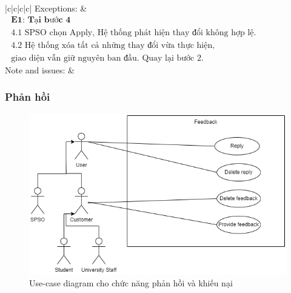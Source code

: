 \begin{tabular}{|c|c|c|c|}
\hline Exceptions: & 
{$
\begin{array}{l}
\textbf { E1: Tại bước 4 } \\
\text { 4.1 SPSO chọn Apply, Hệ thống phát hiện thay đổi không hợp lệ.} \\
\text { 4.2 Hệ thống xóa tất cả những thay đổi vừa thực hiện,} \\
\text { giao diện vẫn giữ nguyên ban đầu.  Quay lại bước 2.} 
\text {}\end{array}
$} \\
\hline Note and issues: &  \\
\hline
\end{tabular}

\subsubsection{Phản hồi}
\begin{figure}[H]
    \begin{center}
        \includegraphics[width=1\textwidth]{Images/Requirement Elicitation/Feedback_Use-case.png}
        \caption{Use-case diagram cho chức năng phản hồi và khiếu nại}
        \label{fig:arch}
    \end{center}
\end{figure}

